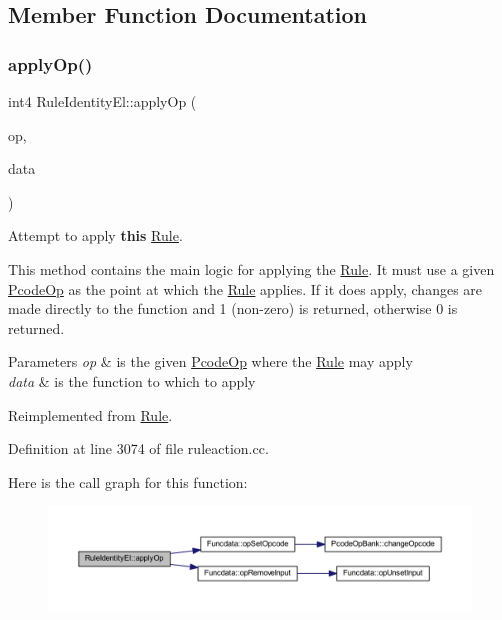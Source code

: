 \subsection{Member Function Documentation}
\mbox{\label{class_rule_identity_el_ac18d09444f528e99a17e0619c426d1ec}} 
\subsubsection{\texorpdfstring{applyOp()}{applyOp()}}
{\footnotesize\ttfamily int4 Rule\+Identity\+El\+::apply\+Op (\begin{DoxyParamCaption}\item[{\mbox{\hyperlink{class_pcode_op}{Pcode\+Op}} $\ast$}]{op,  }\item[{\mbox{\hyperlink{class_funcdata}{Funcdata}} \&}]{data }\end{DoxyParamCaption})\hspace{0.3cm}{\ttfamily [virtual]}}



Attempt to apply {\bfseries{this}} \mbox{\hyperlink{class_rule}{Rule}}. 

This method contains the main logic for applying the \mbox{\hyperlink{class_rule}{Rule}}. It must use a given \mbox{\hyperlink{class_pcode_op}{Pcode\+Op}} as the point at which the \mbox{\hyperlink{class_rule}{Rule}} applies. If it does apply, changes are made directly to the function and 1 (non-\/zero) is returned, otherwise 0 is returned. 
\begin{DoxyParams}{Parameters}
{\em op} & is the given \mbox{\hyperlink{class_pcode_op}{Pcode\+Op}} where the \mbox{\hyperlink{class_rule}{Rule}} may apply \\
\hline
{\em data} & is the function to which to apply \\
\hline
\end{DoxyParams}


Reimplemented from \mbox{\hyperlink{class_rule_a4e3e61f066670175009f60fb9dc60848}{Rule}}.



Definition at line 3074 of file ruleaction.\+cc.

Here is the call graph for this function\+:
\nopagebreak
\begin{figure}[H]
\begin{center}
\leavevmode
\includegraphics[width=350pt]{class_rule_identity_el_ac18d09444f528e99a17e0619c426d1ec_cgraph}
\end{center}
\end{figure}
\mbox{\label{class_rule_identity_el_acacffc41cdb3a56a693132b9b6de63d0}} 
